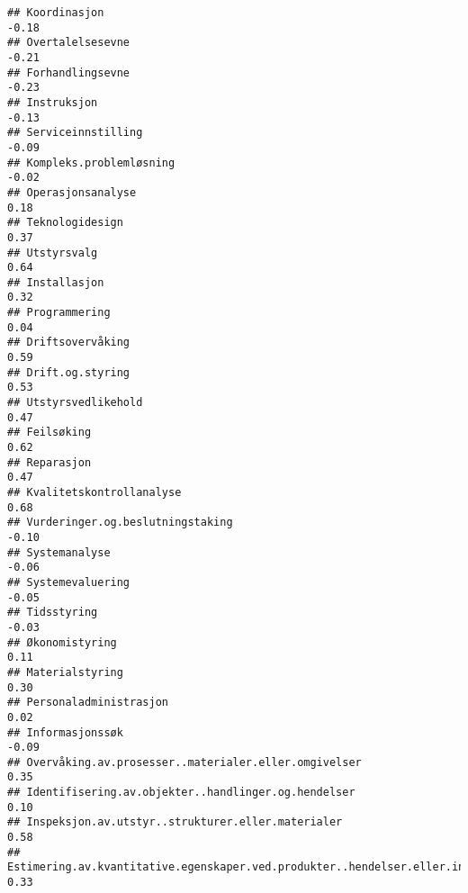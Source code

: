 \documentclass[
]{article}
\begin{document}
\begin{verbatim}
## Koordinasjon                                                                     -0.18
## Overtalelsesevne                                                                 -0.21
## Forhandlingsevne                                                                 -0.23
## Instruksjon                                                                      -0.13
## Serviceinnstilling                                                               -0.09
## Kompleks.problemløsning                                                          -0.02
## Operasjonsanalyse                                                                 0.18
## Teknologidesign                                                                   0.37
## Utstyrsvalg                                                                       0.64
## Installasjon                                                                      0.32
## Programmering                                                                     0.04
## Driftsovervåking                                                                  0.59
## Drift.og.styring                                                                  0.53
## Utstyrsvedlikehold                                                                0.47
## Feilsøking                                                                        0.62
## Reparasjon                                                                        0.47
## Kvalitetskontrollanalyse                                                          0.68
## Vurderinger.og.beslutningstaking                                                 -0.10
## Systemanalyse                                                                    -0.06
## Systemevaluering                                                                 -0.05
## Tidsstyring                                                                      -0.03
## Økonomistyring                                                                    0.11
## Materialstyring                                                                   0.30
## Personaladministrasjon                                                            0.02
## Informasjonssøk                                                                  -0.09
## Overvåking.av.prosesser..materialer.eller.omgivelser                              0.35
## Identifisering.av.objekter..handlinger.og.hendelser                               0.10
## Inspeksjon.av.utstyr..strukturer.eller.materialer                                 0.58
## Estimering.av.kvantitative.egenskaper.ved.produkter..hendelser.eller.informasjon  0.33

\end{verbatim}
\end{document}
